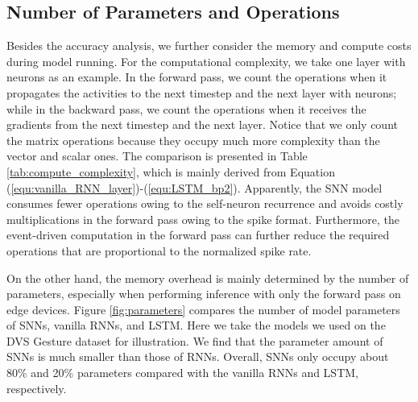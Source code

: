 \documentclass[journal,10pt,twocolumn]{IEEETran}
\begin{document}
\subsection{Number of Parameters and Operations}


Besides the accuracy analysis, we further consider the memory and compute costs during model running. For the computational complexity, we take one layer with  neurons as an example. In the forward pass, we count the operations when it propagates the activities to the next timestep and the next layer with  neurons; while in the backward pass, we count the operations when it receives the gradients from the next timestep and the next layer. Notice that we only count the matrix operations because they occupy much more complexity than the vector and scalar ones. The comparison is presented in Table \ref{tab:compute_complexity}, which is mainly derived from Equation (\ref{equ:vanilla_RNN_layer})-(\ref{equ:LSTM_bp2}). Apparently, the SNN model consumes fewer operations owing to the self-neuron recurrence and avoids costly multiplications in the forward pass owing to the spike format. Furthermore, the event-driven computation in the forward pass can further reduce the required operations that are proportional to the normalized spike rate.

\begin{table}[!htbp]
\caption{Computational complexity comparison. ADDs -- additions, MULs -- multiplications, MACs -- multiplications and additions,  -- normalized spike rate.}
\label{tab:compute_complexity}
\vspace{2pt}
\centering
\renewcommand\arraystretch{1.3}
\end{table}

On the other hand, the memory overhead is mainly determined by the number of parameters, especially when performing inference with only the forward pass on edge devices. Figure \ref{fig:parameters} compares the number of model parameters of SNNs, vanilla RNNs, and LSTM. Here we take the models we used on the DVS Gesture dataset for illustration. We find that the parameter amount of SNNs is much smaller than those of RNNs. Overall, SNNs only occupy about 80\% and 20\% parameters compared with the vanilla RNNs and LSTM, respectively.
\end{document}
